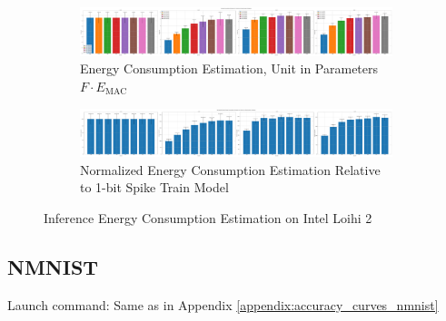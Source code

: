         \begin{figure}[H]
            \centering
            \begin{subfigure}[H]{\textwidth}
                \includegraphics[width=\textwidth]{../standard/MNIST/plots/mnist_test_energy_nh.pdf}
                \caption{Energy Consumption Estimation, Unit in Parameters $F\cdot E_{\text{MAC}}$}
            \end{subfigure}
            \hfill
            \begin{subfigure}[H]{\textwidth}
                \includegraphics[width=\textwidth]{../standard/MNIST/plots/mnist_test_relative_energy_nh.pdf}
                \caption{Normalized Energy Consumption Estimation Relative to 1-bit Spike Train Model}
            \end{subfigure}
            \caption{Inference Energy Consumption Estimation on Intel Loihi 2}
        \end{figure}

    \subsection{NMNIST}
    \label{appendix:energy_neuromorphic_nmnist}
        Launch command: Same as in Appendix \ref{appendix:accuracy_curves_nmnist}

